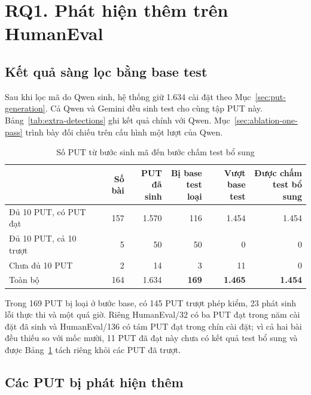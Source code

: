 \section{RQ1. Phát hiện thêm trên HumanEval}
\label{sec:human-eval-score}

\subsection{Kết quả sàng lọc bằng base test}

Sau khi lọc mã do Qwen sinh, hệ thống giữ 1.634 cài đặt theo Mục~\ref{sec:put-generation}. Cả Qwen và Gemini đều sinh test cho cùng tập PUT này. Bảng~\ref{tab:extra-detections} ghi kết quả chính với Qwen. Mục~\ref{sec:ablation-one-pass} trình bày đối chiếu trên cấu hình một lượt của Qwen.

\begin{table}[!htbp]
\centering
\caption{Số PUT từ bước sinh mã đến bước chấm test bổ sung}
\label{tab:base-screen}
\small
\begin{tabular*}{\linewidth}{@{\extracolsep{\fill}}lrrrrr@{}}
\toprule
& Số bài & \shortstack[r]{PUT\\đã sinh} & \shortstack[r]{Bị base\\test loại} & \shortstack[r]{Vượt\\base test} & \shortstack[r]{Được chấm\\test bổ sung} \\
\midrule
Đủ 10 PUT, có PUT đạt & 157 & 1.570 & 116 & 1.454 & 1.454 \\
Đủ 10 PUT, cả 10 trượt & 5 & 50 & 50 & 0 & 0 \\
Chưa đủ 10 PUT & 2 & 14 & 3 & 11 & 0 \\
\midrule
Toàn bộ & 164 & 1.634 & \textbf{169} & \textbf{1.465} & \textbf{1.454} \\
\bottomrule
\end{tabular*}
\end{table}

Trong 169 PUT bị loại ở bước base, có 145 PUT trượt phép kiểm, 23 phát sinh lỗi thực thi và một quá giờ. Riêng HumanEval/32 có ba PUT đạt trong năm cài đặt đã sinh và HumanEval/136 có tám PUT đạt trong chín cài đặt; vì cả hai bài đều thiếu so với mốc mười, 11 PUT đã đạt này chưa có kết quả test bổ sung và được Bảng~\ref{tab:base-screen} tách riêng khỏi các PUT đã trượt.

\subsection{Các PUT bị phát hiện thêm}

